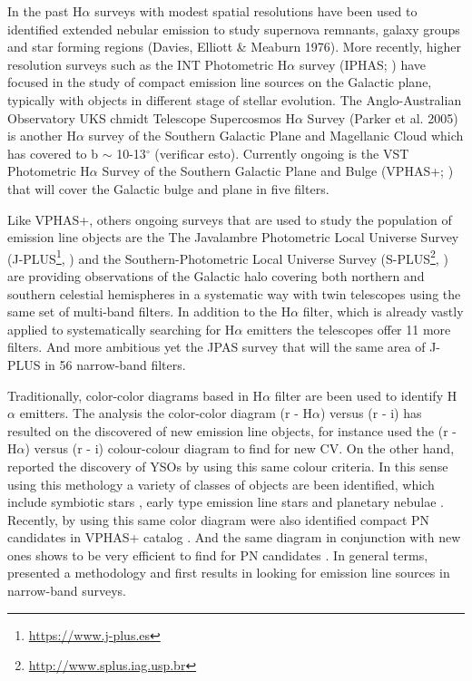 \documentclass[fleqn,usenatbib]{mnras}
\begin{document}
In the past H$\alpha$ surveys with modest spatial resolutions have been used
to identified extended nebular emission to study supernova remnants, galaxy
groups and star forming regions (Davies, Elliott \& Meaburn 1976). More recently,
higher resolution surveys such as the INT Photometric H$\alpha$ survey
(IPHAS; \citealt{Drew:2005, Barentsen:2014}) have focused in the study of
compact emission line sources on the Galactic plane, typically with objects
in different stage of stellar evolution. The Anglo-Australian Observatory UKS
chmidt Telescope Supercosmos H$\alpha$ Survey (Parker et al. 2005) is another
H{$\alpha$} survey of the Southern Galactic Plane and Magellanic Cloud which
has covered to b $\sim$ 10-13$^{\circ}$ (verificar esto). Currently ongoing is
the VST Photometric H$\alpha$ Survey of the Southern Galactic Plane and Bulge
(VPHAS+; \citealt{Drew:2014}) that will cover the Galactic bulge and plane in
five filters. 

Like VPHAS+, others ongoing surveys that are used to study the population of
emission line objects are the The Javalambre Photometric Local Universe Survey
(J-PLUS\footnote{\url{https://www.j-plus.es}}, \citealp{Cenarro:2018})
and the Southern-Photometric Local Universe Survey
(S-PLUS\footnote{\url{http://www.splus.iag.usp.br}}, \citealp{Mendes:2019})
are providing observations of the Galactic halo covering both northern and
southern celestial hemispheres in a systematic way with twin telescopes
using the same set of multi-band filters. In addition to the H$\alpha$ filter,
which is already vastly applied to systematically searching for H$\alpha$ emitters
the telescopes offer 11 more filters. And more ambitious yet the JPAS survey that
will the same area of J-PLUS in 56 narrow-band filters.

Traditionally, color-color diagrams based in H$\alpha$ filter are been used to
identify H$\alpha$ emitters.  The analysis the color-color diagram  (r - H$\alpha$)
versus (r - i) has resulted on the discovered of new emission line objects, for
instance \citet{Witham:2006, Witham:2007}  used the (r - H$\alpha$) versus (r - i)
colour-colour diagram to find for new CV. On the other hand, \citet{Vink:2008}
reported the discovery of YSOs by using this same colour criteria. In this sense using
this methology a variety of classes of objects are been identified, which include
symbiotic stars \citep{Corradi:2008, Corradi:2010, Corradi:2011}, early type emission
line stars \citep{Drew:2008} and planetary nebulae \citep{Viirone:2009, Sabin:2010}.
Recently, by using this same color diagram were also identified compact PN candidates
in VPHAS+ catalog \citep{Akras:2019}. And the same diagram in conjunction with new
ones shows to be very efficient to find for PN candidates \citep{Gutierrez:2020}.
In general terms, \citet{Witham:2006} presented a methodology and first results
in looking for emission line sources in narrow-band surveys.
\end{document}
